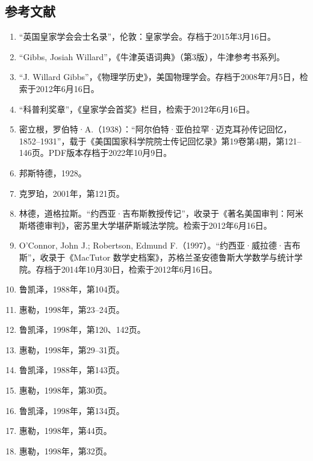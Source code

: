 \subsection{参考文献}
\begin{enumerate}
\item “英国皇家学会会士名录”，伦敦：皇家学会。存档于2015年3月16日。
\item “Gibbs, Josiah Willard”，《牛津英语词典》（第3版），牛津参考书系列。
\item “J. Willard Gibbs”，《物理学历史》，美国物理学会。存档于2008年7月5日，检索于2012年6月16日。
\item “科普利奖章”，《皇家学会首奖》栏目，检索于2012年6月16日。
\item 密立根，罗伯特·A.（1938）：“阿尔伯特·亚伯拉罕·迈克耳孙传记回忆，1852–1931”，载于《美国国家科学院院士传记回忆录》第19卷第4期，第121–146页。PDF版本存档于2022年10月9日。
\item 邦斯特德，1928。
\item 克罗珀，2001年，第121页。
\item 林德，道格拉斯。“约西亚·吉布斯教授传记”，收录于《著名美国审判：阿米斯塔德审判》，密苏里大学堪萨斯城法学院。检索于2012年6月16日。
\item O'Connor, John J.; Robertson, Edmund F.（1997）。“约西亚·威拉德·吉布斯”，收录于《MacTutor 数学史档案》，苏格兰圣安德鲁斯大学数学与统计学院。存档于2014年10月30日，检索于2012年6月16日。
\item 鲁凯泽，1988年，第104页。
\item 惠勒，1998年，第23–24页。
\item 鲁凯泽，1998年，第120、142页。
\item 惠勒，1998年，第29–31页。
\item 鲁凯泽，1988年，第143页。
\item 惠勒，1998年，第30页。
\item 鲁凯泽，1998年，第134页。
\item 惠勒，1998年，第44页。
\item 惠勒，1998年，第32页。

\end{enumerate}